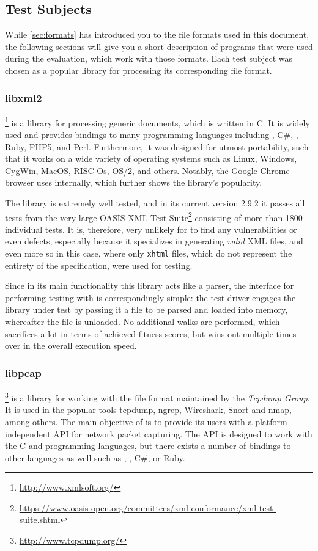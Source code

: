 \subsection{Test Subjects}
While \cref{sec:formats} has introduced you to the file formats used in this document, the following sections
will give you a short description of programs that were used during the evaluation, which work with those
formats. Each test subject was chosen as a popular library for processing its corresponding file format.
\tocless\subsubsection{libxml2}
\libxml\footnote{\url{http://www.xmlsoft.org/}} is a library for processing generic \xml documents,
which is written in C. It is widely used and provides bindings to many programming languages
including \cpp, C\#, \python{}, Ruby, PHP5, and Perl. Furthermore, it was
designed for utmost portability, such that it works on a wide variety of operating systems such as
Linux, Windows, CygWin, MacOS, RISC Os, OS/2, and others. Notably, the Google Chrome
browser uses \libxml internally, which further shows the library's popularity.

The library is extremely well tested, and in its current version 2.9.2 it passes all tests from the very large
OASIS XML Test Suite\footnote{\url{https://www.oasis-open.org/committees/xml-conformance/xml-test-suite.shtml}}
consisting of more than 1800 individual tests. It is, therefore, very unlikely for \xmlmate to find any
vulnerabilities or even defects, especially because it specializes in generating \emph{valid} XML files, and
even more so in this case, where only \texttt{xhtml} files, which do not represent the entirety of the \xml
specification, were used for testing.

Since in its main functionality this library acts like a parser, the interface for performing testing with
\xmlmate is correspondingly simple: the test driver engages the library under test by passing it a file to be
parsed and loaded into memory, whereafter the file is unloaded. No additional walks are performed, which
sacrifices a lot in terms of achieved fitness scores, but wins out multiple times over in the
overall execution speed.


\tocless\subsubsection{libpcap}
\libpcap\footnote{\url{http://www.tcpdump.org/}} is a library for working with the \pcap file format
maintained by the \emph{Tcpdump Group}. It is used in the popular tools tcpdump, ngrep, Wireshark, Snort and
nmap, among others. The main objective of \libpcap is to provide its users with a
platform-independent API for network packet capturing. The API is designed to work with the C and \cpp
programming languages, but there exists a number of bindings to other languages as well such as \python, \java,
C\#, or Ruby.

